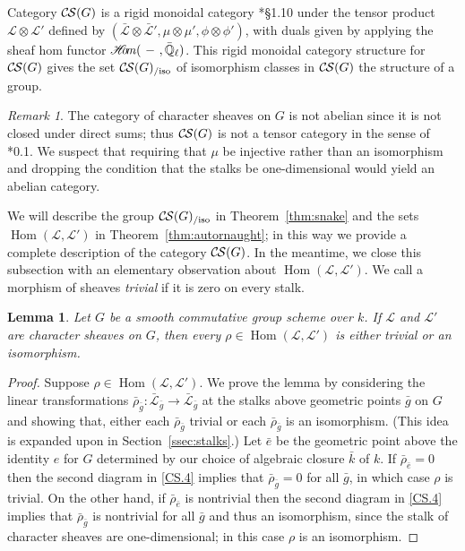 \documentclass[10pt]{amsart}
\theoremstyle{plain}
\newtheorem{lemma}[theorem]{Lemma}
\theoremstyle{definition}
\theoremstyle{remark}
\newtheorem{remark}[theorem]{Remark}
\newcommand{\EE}{\mathbb{\bar Q}_\ell}
\newcommand{\bFq}{\bar{k}}
\newcommand{\Fq}{k}
\DeclareMathOperator{\Hom}{Hom}
\newcommand{\sheafHom}{{\mathscr{H}\hskip-4pt{\it o}\hskip-2pt{\it m}}}
\newcommand{\cs}[1]{{\mathcal{#1}}}
\newcommand{\gcs}[1]{{\mathcal{\bar #1}}}
\newcommand{\CS}{{\mathcal{C\hskip-0.8pt S}}}
\newcommand{\CSiso}[1]{\CS(#1)_{/\text{iso}}}
\newcommand{\bg}{{\bar{g}}}
\newcommand{\brho}{{\bar\rho}}
\begin{document}
Category $\CS(G)$ is a rigid monoidal category
\cite{etingof:09a}*{\S1.10} under the tensor product
$\cs{L} \otimes \cs{L'}$ defined by $(\gcs{L}\otimes\gcs{L'}, \mu\otimes\mu', \phi\otimes \phi')$,
with duals given by applying the sheaf hom functor
$\sheafHom(\ - \ ,\EE)$.
This rigid monoidal category structure for $\CS(G)$ gives the set $\CSiso{G}$
of isomorphism classes in $\CS(G)$ the structure of a group.

\begin{remark}
The category of character sheaves on $G$ is not abelian since it is not closed under direct sums; 
thus $\CS(G)$ is not a tensor category in the sense of \cite{deligne:02a}*{0.1}.  
We suspect that requiring that $\mu$ be injective rather than
an isomorphism and dropping the condition that the stalks be one-dimensional would yield an abelian category.
\end{remark}

We will describe the group $\CSiso{G}$ in Theorem~\ref{thm:snake}
and the sets $\Hom(\cs{L},\cs{L}')$ in Theorem~\ref{thm:autornaught}; in this way we provide a complete description of the category $\CS(G)$.
%
In the meantime, we close this subsection with an elementary observation about $\Hom(\cs{L},\cs{L}')$.
We call a morphism of sheaves \emph{trivial} if it is zero on every stalk.

\begin{lemma}\label{lem:autornaught}
Let $G$ be a smooth commutative group scheme over $\Fq$.
If $\cs{L}$ and $\cs{L}'$ are character sheaves on $G$, then
every $\rho\in \Hom(\cs{L},\cs{L}')$ is either trivial or an isomorphism. 
\end{lemma}

\begin{proof}
Suppose $\rho \in \Hom(\cs{L},\cs{L}')$.
We prove the lemma by considering the linear transformations $\brho_{\bg} : \gcs{L}_{\bg} \to \gcs{L}_{\bg}$ at the stalks above geometric points $\bg$ on $G$ and showing that, either each $\brho_{\bg}$ trivial or each $\brho_{\bg}$ is an isomorphism.
(This idea is expanded upon in Section~\ref{ssec:stalks}.)
Let ${\bar e}$ be the geometric point above the identity $e$ for $G$ determined by our choice of algebraic closure $\bFq$ of $\Fq$.
If $\brho_{\bar e} = 0$ then the second diagram in \ref{CS.4} implies that $\brho_{\bg} = 0$ for all $\bg$, in which case $\rho$ is trivial.
On the other hand, if $\brho_{\bar e}$ is nontrivial then the second diagram in \ref{CS.4}  implies that $\brho_{\bg}$ is nontrivial for all $\bg$ and thus an isomorphism, since the stalk of character sheaves are one-dimensional; in this case $\rho$ is an isomorphism.
\end{proof}
\end{document}
